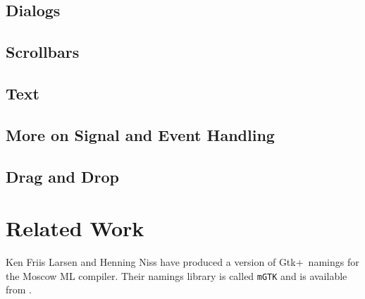 \documentclass{article}
\newcommand{\gtk}{\mbox{\sf Gtk+}}
\begin{document}
\subsection{Dialogs}

\subsection{Scrollbars}

\subsection{Text}

\subsection{More on Signal and Event Handling}

\subsection{Drag and Drop}


\section{Related Work}

    Ken Friis Larsen and Henning Niss have produced a version of 
\gtk\ namings for the Moscow ML compiler.  Their namings library
is called \verb|mGTK|\cite{mGTK} and is available from
.


\end{document}
